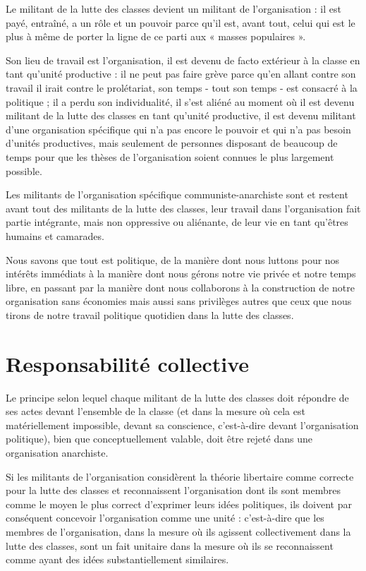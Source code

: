 Le militant de la lutte des classes devient un militant de l'organisation : il est payé, entraîné, a un rôle et un pouvoir parce qu'il est, avant tout, celui qui est le plus à même de porter la ligne de ce parti aux « masses populaires ».

Son lieu de travail est l'organisation, il est devenu de facto extérieur à la classe en tant qu'unité productive : il ne peut pas faire grève parce qu'en allant contre son travail il irait contre le prolétariat, son temps - tout son temps - est consacré à la politique ; il a perdu son individualité, il s'est aliéné au moment où il est devenu militant de la lutte des classes en tant qu'unité productive, il est devenu militant d'une organisation spécifique qui n'a pas encore le pouvoir et qui n'a pas besoin d'unités productives, mais seulement de personnes disposant de beaucoup de temps pour que les thèses de l'organisation soient connues le plus largement possible.

Les militants de l'organisation spécifique communiste-anarchiste sont et restent avant tout des militants de la lutte des classes, leur travail dans l'organisation fait partie intégrante, mais non oppressive ou aliénante, de leur vie en tant qu'êtres humains et camarades.

Nous savons que tout est politique, de la manière dont nous luttons pour nos intérêts immédiats à la manière dont nous gérons notre vie privée et notre temps libre, en passant par la manière dont nous collaborons à la construction de notre organisation sans économies mais aussi sans privilèges autres que ceux que nous tirons de notre travail politique quotidien dans la lutte des classes.

\section{Responsabilité collective}\hypertarget{responsabilit-collective}{}\label{responsabilit-collective}

Le principe selon lequel chaque militant de la lutte des classes doit répondre de ses actes devant l'ensemble de la classe (et dans la mesure où cela est matériellement impossible, devant sa conscience, c'est-à-dire devant l'organisation politique), bien que conceptuellement valable, doit être rejeté dans une organisation anarchiste.

Si les militants de l'organisation considèrent la théorie libertaire comme correcte pour la lutte des classes et reconnaissent l'organisation dont ils sont membres comme le moyen le plus correct d'exprimer leurs idées politiques, ils doivent par conséquent concevoir l'organisation comme une unité : c'est-à-dire que les membres de l'organisation, dans la mesure où ils agissent collectivement dans la lutte des classes, sont un fait unitaire dans la mesure où ils se reconnaissent comme ayant des idées substantiellement similaires.

